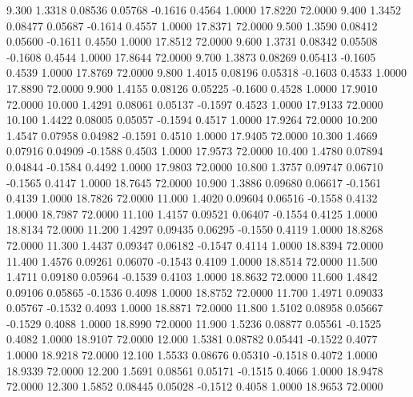    9.300   1.3318   0.08536   0.05768  -0.1616   0.4564   1.0000  17.8220  72.0000
   9.400   1.3452   0.08477   0.05687  -0.1614   0.4557   1.0000  17.8371  72.0000
   9.500   1.3590   0.08412   0.05600  -0.1611   0.4550   1.0000  17.8512  72.0000
   9.600   1.3731   0.08342   0.05508  -0.1608   0.4544   1.0000  17.8644  72.0000
   9.700   1.3873   0.08269   0.05413  -0.1605   0.4539   1.0000  17.8769  72.0000
   9.800   1.4015   0.08196   0.05318  -0.1603   0.4533   1.0000  17.8890  72.0000
   9.900   1.4155   0.08126   0.05225  -0.1600   0.4528   1.0000  17.9010  72.0000
  10.000   1.4291   0.08061   0.05137  -0.1597   0.4523   1.0000  17.9133  72.0000
  10.100   1.4422   0.08005   0.05057  -0.1594   0.4517   1.0000  17.9264  72.0000
  10.200   1.4547   0.07958   0.04982  -0.1591   0.4510   1.0000  17.9405  72.0000
  10.300   1.4669   0.07916   0.04909  -0.1588   0.4503   1.0000  17.9573  72.0000
  10.400   1.4780   0.07894   0.04844  -0.1584   0.4492   1.0000  17.9803  72.0000
  10.800   1.3757   0.09747   0.06710  -0.1565   0.4147   1.0000  18.7645  72.0000
  10.900   1.3886   0.09680   0.06617  -0.1561   0.4139   1.0000  18.7826  72.0000
  11.000   1.4020   0.09604   0.06516  -0.1558   0.4132   1.0000  18.7987  72.0000
  11.100   1.4157   0.09521   0.06407  -0.1554   0.4125   1.0000  18.8134  72.0000
  11.200   1.4297   0.09435   0.06295  -0.1550   0.4119   1.0000  18.8268  72.0000
  11.300   1.4437   0.09347   0.06182  -0.1547   0.4114   1.0000  18.8394  72.0000
  11.400   1.4576   0.09261   0.06070  -0.1543   0.4109   1.0000  18.8514  72.0000
  11.500   1.4711   0.09180   0.05964  -0.1539   0.4103   1.0000  18.8632  72.0000
  11.600   1.4842   0.09106   0.05865  -0.1536   0.4098   1.0000  18.8752  72.0000
  11.700   1.4971   0.09033   0.05767  -0.1532   0.4093   1.0000  18.8871  72.0000
  11.800   1.5102   0.08958   0.05667  -0.1529   0.4088   1.0000  18.8990  72.0000
  11.900   1.5236   0.08877   0.05561  -0.1525   0.4082   1.0000  18.9107  72.0000
  12.000   1.5381   0.08782   0.05441  -0.1522   0.4077   1.0000  18.9218  72.0000
  12.100   1.5533   0.08676   0.05310  -0.1518   0.4072   1.0000  18.9339  72.0000
  12.200   1.5691   0.08561   0.05171  -0.1515   0.4066   1.0000  18.9478  72.0000
  12.300   1.5852   0.08445   0.05028  -0.1512   0.4058   1.0000  18.9653  72.0000
